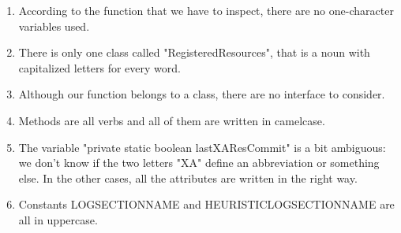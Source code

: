 \begin{enumerate}
	\item According to the function that we have to inspect, there are no one-character variables used.
	\item There is only one class called "RegisteredResources", that is a noun with capitalized letters for every word.
	\item Although our function belongs to a class, there are no interface to consider.
	\item Methods are all verbs and all of them are written in camelcase.
	\item The variable "private static boolean lastXAResCommit" is a bit ambiguous: we don't know if the two letters "XA" define an abbreviation or something else. In the other cases, all the attributes are written in the right way.
	\item Constants LOG\textunderscore SECTION\textunderscore NAME and HEURISTIC\textunderscore LOG\textunderscore SECTION\textunderscore NAME are all in uppercase.
\end{enumerate}
